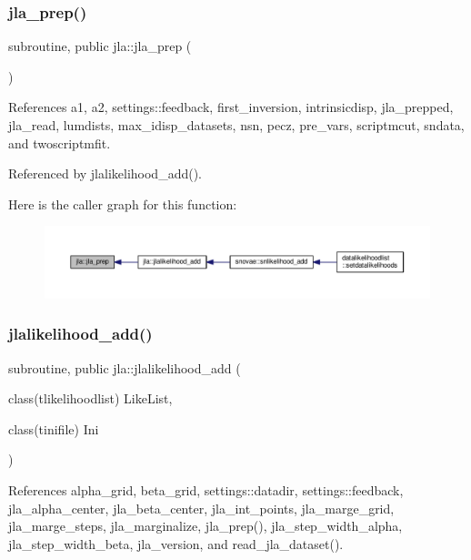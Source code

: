\subsubsection{\texorpdfstring{jla\+\_\+prep()}{jla\_prep()}}
{\footnotesize\ttfamily subroutine, public jla\+::jla\+\_\+prep (\begin{DoxyParamCaption}{ }\end{DoxyParamCaption})}



References a1, a2, settings\+::feedback, first\+\_\+inversion, intrinsicdisp, jla\+\_\+prepped, jla\+\_\+read, lumdists, max\+\_\+idisp\+\_\+datasets, nsn, pecz, pre\+\_\+vars, scriptmcut, sndata, and twoscriptmfit.



Referenced by jlalikelihood\+\_\+add().

Here is the caller graph for this function\+:
\nopagebreak
\begin{figure}[H]
\begin{center}
\leavevmode
\includegraphics[width=350pt]{namespacejla_a840bbaee909bef635242328944cb1a14_icgraph}
\end{center}
\end{figure}
\mbox{\label{namespacejla_a76279ec95aebe74a01796fb5d2734d94}} 
\subsubsection{\texorpdfstring{jlalikelihood\+\_\+add()}{jlalikelihood\_add()}}
{\footnotesize\ttfamily subroutine, public jla\+::jlalikelihood\+\_\+add (\begin{DoxyParamCaption}\item[{class(tlikelihoodlist)}]{Like\+List,  }\item[{class(tinifile)}]{Ini }\end{DoxyParamCaption})}



References alpha\+\_\+grid, beta\+\_\+grid, settings\+::datadir, settings\+::feedback, jla\+\_\+alpha\+\_\+center, jla\+\_\+beta\+\_\+center, jla\+\_\+int\+\_\+points, jla\+\_\+marge\+\_\+grid, jla\+\_\+marge\+\_\+steps, jla\+\_\+marginalize, jla\+\_\+prep(), jla\+\_\+step\+\_\+width\+\_\+alpha, jla\+\_\+step\+\_\+width\+\_\+beta, jla\+\_\+version, and read\+\_\+jla\+\_\+dataset().



